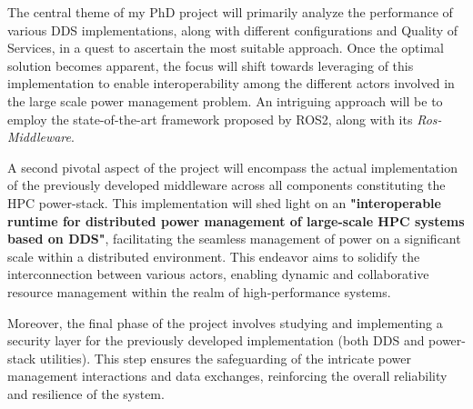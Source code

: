 
The central theme of my PhD project will primarily analyze the performance of various DDS implementations, along with different configurations and Quality of Services, in a quest to ascertain the most suitable approach. Once the optimal solution becomes apparent, the focus will shift towards leveraging of this implementation to enable interoperability among the different actors involved in the large scale power management problem. An intriguing approach will be to employ the state-of-the-art framework proposed by ROS2, along with its \emph{Ros-Middleware}. 

A second pivotal aspect of the project will encompass the actual implementation of the previously developed middleware across all components constituting the HPC power-stack. This implementation will shed light on an \textbf{"interoperable runtime for distributed power management of large-scale HPC systems based on DDS"}, facilitating the seamless management of power on a significant scale within a distributed environment. This endeavor aims to solidify the interconnection between various actors, enabling dynamic and collaborative resource management within the realm of high-performance systems.

Moreover, the final phase of the project involves studying and implementing a security layer for the previously developed implementation (both DDS and power-stack utilities). This step ensures the safeguarding of the intricate power management interactions and data exchanges, reinforcing the overall reliability and resilience of the system.
\newpage
